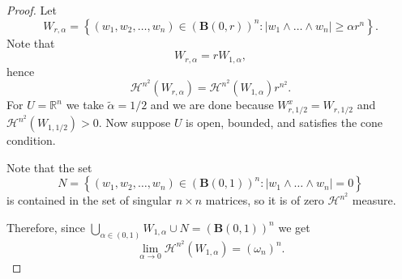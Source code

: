 \documentclass[11pt]{amsart}
\newcommand{\R}{\mathbb{R}}
\renewcommand{\H}{\mathscr{H}}
\theoremstyle{definition}
\begin{document}
	\begin{proof}
		Let	
		\[	W_{r,\alpha} = \left\{(w_1,w_2,\dots,w_{n})\in(\textbf{B}(0,r))^n : |w_1\wedge\dots\wedge w_n|\geq\alpha r^n\right\}.
		\]
		Note that
		\[	W_{r,\alpha} = rW_{1,\alpha},
		\]
		hence 
		\begin{equation}\label{eq:wr_scaling}
		\H^{n^2}(W_{r,\alpha}) = \H^{n^2}(W_{1,\alpha})r^{n^2}.
		\end{equation}
		For $U=\R^n$ we take $\tilde{\alpha}=1/2$ and we are done because $W^x_{r,1/2}=W_{r,1/2}$ and $\H^{n^2}(W_{1,1/2})>0$. Now suppose $U$ is open, bounded, and satisfies the cone condition.
		
		Note that the set
		\[
		N = \left\{(w_1,w_2,\dots,w_{n})\in(\textbf{B}(0,1))^n : |w_1\wedge\dots\wedge w_n|=0\right\}
		\]
		is contained in the set of singular $n\times n$ matrices, so it is of zero $\H^{n^2}$ measure.
		
		Therefore, since $\bigcup_{\alpha\in(0,1)}W_{1,\alpha}\cup N= (\textbf{B}(0,1))^n$ we get
		\begin{equation}\label{eq:lim_alpha}
		\lim_{\alpha\rightarrow 0}\H^{n^2}(W_{1,\alpha}) = (\omega_n)^n.	
		\end{equation}
		
		
		

\end{proof}
\end{document}
